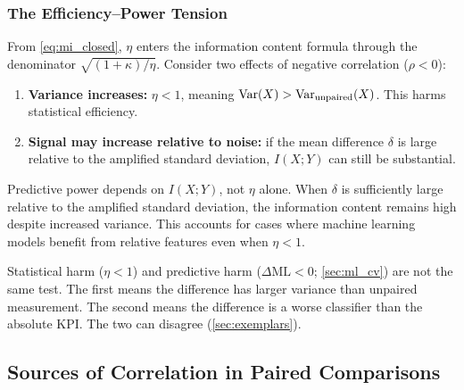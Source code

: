 \subsubsection{The Efficiency--Power Tension}
\label{sec:eff_power_theory}

From \cref{eq:mi_closed}, $\eta$ enters the information content formula through the denominator $\sqrt{(1+\kappa)/\eta}$. Consider two effects of negative correlation ($\rho<0$):
\begin{enumerate}
  \item \textbf{Variance increases:} $\eta<1$, meaning $\operatorname{Var}(X)>\operatorname{Var}_{\text{unpaired}}(X)$. This harms statistical efficiency.
  \item \textbf{Signal may increase relative to noise:} if the mean difference $\delta$ is large relative to the amplified standard deviation, $I(X;Y)$ can still be substantial.
\end{enumerate}
Predictive power depends on $I(X;Y)$, not $\eta$ alone. When $\delta$ is sufficiently large relative to the amplified standard deviation, the information content remains high despite increased variance. This accounts for cases where machine learning models benefit from relative features even when $\eta<1$.

Statistical harm ($\eta<1$) and predictive harm ($\Delta\mathrm{ML}<0$; \cref{sec:ml_cv}) are not the same test. The first means the difference has larger variance than unpaired measurement. The second means the difference is a worse classifier than the absolute KPI. The two can disagree (\cref{sec:exemplars}).

\subsection{Sources of Correlation in Paired Comparisons}

